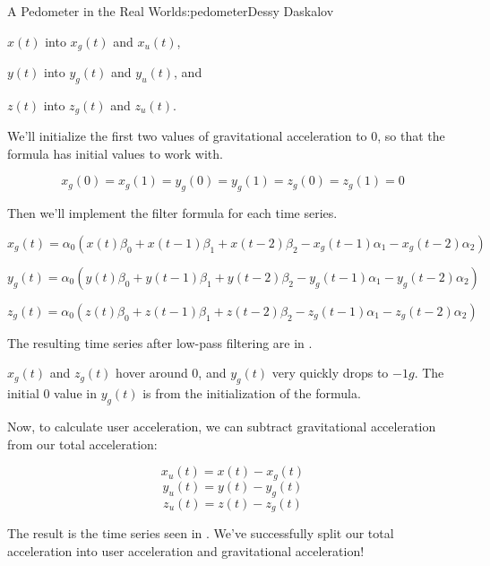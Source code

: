 \begin{aosachapter}{A Pedometer in the Real World}{s:pedometer}{Dessy Daskalov}
\begin{aosaitemize}
\item
  $x(t)$ into $x_{g}(t)$ and $x_{u}(t)$,
\item
  $y(t)$ into $y_{g}(t)$ and $y_{u}(t)$, and
\item
  $z(t)$ into $z_{g}(t)$ and $z_{u}(t)$.
\end{aosaitemize}

We'll initialize the first two values of gravitational acceleration to
0, so that the formula has initial values to work with.

\[x_{g}(0) = x_{g}(1) = y_{g}(0) = y_{g}(1) = z_{g}(0) = z_{g}(1) = 0\]

Then we'll implement the filter formula for each time series.

\[x_{g}(t) = \alpha_{0}(x(t)\beta_{0} + x(t-1)\beta_{1} + x(t-2)\beta_{2} - x_{g}(t-1)\alpha_{1} - x_{g}(t-2)\alpha_{2})\]

\[y_{g}(t) = \alpha_{0}(y(t)\beta_{0} + y(t-1)\beta_{1} + y(t-2)\beta_{2} - y_{g}(t-1)\alpha_{1} - y_{g}(t-2)\alpha_{2})\]

\[z_{g}(t) = \alpha_{0}(z(t)\beta_{0} + z(t-1)\beta_{1} + z(t-2)\beta_{2} - z_{g}(t-1)\alpha_{1} - z_{g}(t-2)\alpha_{2})\]

The resulting time series after low-pass filtering are in
.


$x_{g}(t)$ and $z_{g}(t)$ hover around 0, and $y_{g}(t)$ very quickly
drops to $-1g$. The initial 0 value in $y_{g}(t)$ is from the
initialization of the formula.

Now, to calculate user acceleration, we can subtract gravitational
acceleration from our total acceleration:

\[
x_{u}(t) = x(t) - x_{g}(t)
\] \[
y_{u}(t) = y(t) - y_{g}(t)
\] \[
z_{u}(t) = z(t) - z_{g}(t)
\]

The result is the time series seen in
. We've successfully split
our total acceleration into user acceleration and gravitational
acceleration!


\label{isolating-user-acceleration-in-the-direction-of-gravity}


\end{aosachapter}
